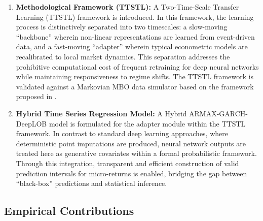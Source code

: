 \documentclass{rQUF2e}
\theoremstyle{plain}
\theoremstyle{definition}
\theoremstyle{remark}
\begin{document}
\begin{enumerate}
    \item \textbf{Methodological Framework (TTSTL):} A Two-Time-Scale Transfer Learning (TTSTL) framework is introduced. In this framework, the learning process is distinctively separated into two timescales: a slow-moving ``backbone'' wherein non-linear representations are learned from event-driven data, and a fast-moving ``adapter'' wherein typical econometric models are recalibrated to local market dynamics. This separation addresses the prohibitive computational cost of frequent retraining for deep neural networks while maintaining responsiveness to regime shifts. The TTSTL framework is validated against a Markovian MBO data simulator based on the framework proposed in \citet{cont2023mathematical}.

    \item \textbf{Hybrid Time Series Regression Model:} A Hybrid ARMAX-GARCH-DeepLOB model is formulated for the adapter module within the TTSTL framework. In contrast to standard deep learning approaches, where deterministic point imputations are produced, neural network outputs are treated here as generative covariates within a formal probabilistic framework. Through this integration, transparent and efficient construction of valid prediction intervals for micro-returns is enabled, bridging the gap between ``black-box'' predictions and statistical inference.
\end{enumerate}

\subsection{Empirical Contributions}
\end{document}
